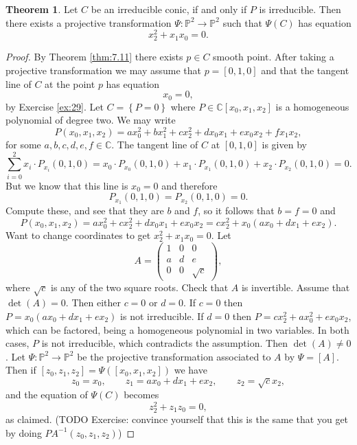 \documentclass{article}
\newcommand{\C}{\mathbb{C}}
\renewcommand{\P}{\mathbb{P}}
\newcommand{\rb}[1]{\left( #1 \right)}
\renewcommand{\sb}[1]{\left[ #1 \right]}
\newcommand{\cb}[1]{\left\{ #1 \right\}}
\theoremstyle{definition}\newtheorem{definition}{Definition}[section]
\theoremstyle{definition}\newtheorem{notation}[definition]{Notation}
\theoremstyle{definition}\newtheorem{remark}[definition]{Remark}
\theoremstyle{definition}\newtheorem{example}[definition]{Example}
\theoremstyle{definition}\newtheorem{fact}{Fact}
\theoremstyle{definition}\newtheorem{exercise}{Exercise}
\newtheorem{theorem}[definition]{Theorem}
\begin{document}
\begin{theorem}
\label{thm:10.2}
Let $ C $ be an irreducible conic, if and only if $ P $ is irreducible. Then there exists a projective transformation $ \Psi : \P^2 \to \P^2 $ such that $ \Psi\rb{C} $ has equation
$$ x_2^2 + x_1x_0 = 0. $$
\end{theorem}

\begin{proof}
By Theorem \ref{thm:7.11} there exists $ p \in C $ smooth point. After taking a projective transformation we may assume that $ p = \sb{0, 1, 0} $ and that the tangent line of $ C $ at the point $ p $ has equation
$$ x_0 = 0, $$
by Exercise \ref{ex:29}. Let $ C = \cb{P = 0} $ where $ P \in \C\sb{x_0, x_1, x_2} $ is a homogeneous polynomial of degree two. We may write
$$ P\rb{x_0, x_1, x_2} = ax_0^2 + bx_1^2 + cx_2^2 + dx_0x_1 + ex_0x_2 + fx_1x_2, $$
for some $ a, b, c, d, e, f \in \C $. The tangent line of $ C $ at $ \sb{0, 1, 0} $ is given by
$$ \sum_{i = 0}^2 x_i \cdot P_{x_i}\rb{0, 1, 0} = x_0 \cdot P_{x_0}\rb{0, 1, 0} + x_1 \cdot P_{x_1}\rb{0, 1, 0} + x_2 \cdot P_{x_2}\rb{0, 1, 0} = 0. $$
But we know that this line is $ x_0 = 0 $ and therefore
$$ P_{x_1}\rb{0, 1, 0} = P_{x_2}\rb{0, 1, 0} = 0. $$
Compute these, and see that they are $ b $ and $ f $, so it follows that $ b = f = 0 $ and
$$ P\rb{x_0, x_1, x_2} = ax_0^2 + cx_2^2 + dx_0x_1 + ex_0x_2 = cx_2^2 + x_0\rb{ax_0 + dx_1 + ex_2}. $$
Want to change coordinates to get $ x_2^2 + x_1x_0 = 0 $. Let
$$ A = \begin{pmatrix} 1 & 0 & 0 \\ a & d & e \\ 0 & 0 & \sqrt{c} \end{pmatrix}, $$
where $ \sqrt{c} $ is any of the two square roots. Check that $ A $ is invertible. Assume that $ \det\rb{A} = 0 $. Then either $ c = 0 $ or $ d = 0 $. If $ c = 0 $ then $ P = x_0\rb{ax_0 + dx_1 + ex_2} $ is not irreducible. If $ d = 0 $ then $ P = cx_2^2 + ax_0^2 + ex_0x_2 $, which can be factored, being a homogeneous polynomial in two variables. In both cases, $ P $ is not irreducible, which contradicts the assumption. Then $ \det\rb{A} \ne 0 $. Let $ \Psi : \P^2 \to \P^2 $ be the projective transformation associated to $ A $ by $ \Psi = \sb{A} $. Then if $ \sb{z_0, z_1, z_2} = \Psi\rb{\sb{x_0, x_1, x_2}} $ we have
$$ z_0 = x_0, \qquad z_1 = ax_0 + dx_1 + ex_2, \qquad z_2 = \sqrt{c}x_2, $$
and the equation of $ \Psi\rb{C} $ becomes
$$ z_2^2 + z_1z_0 = 0, $$
as claimed. (TODO Exercise: convince yourself that this is the same that you get by doing $ PA^{-1}\rb{z_0, z_1, z_2} $)
\end{proof}
\end{document}

